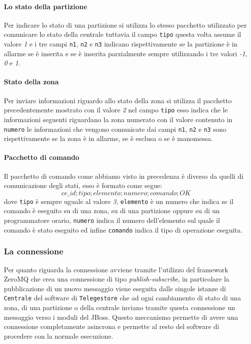 \paragraph{Lo stato della partizione}
Per indicare lo stato di una partizione si utilizza lo stesso pacchetto utilizzato per comunicare lo stato della centrale tuttavia il campo \texttt{tipo} questa volta assume il valore \emph{1} e i tre campi \texttt{n1}, \texttt{n2} e \texttt{n3} indicano rispettivamente se la partizione è in allarme se è inserita e se è inserita parzialmente sempre utilizzando i tre valori \emph{-1, 0} e \emph{1}.
\paragraph{Stato della zona}
Per inviare informazioni riguardo allo stato della zona si utilizza il pacchetto precedentemente mostrato con il valore \emph{2} nel campo \texttt{tipo} esso indica che le informazioni seguenti riguardano la zona numerato con il valore contenuto in \texttt{numero} le informazioni che vengono comunicate dai campi \texttt{n1}, \texttt{n2} e \texttt{n3} sono rispettivamente se la zona è in allarme, se è esclusa o se è manomessa.
\paragraph{Pacchetto di comando}
Il pacchetto di comando come abbiamo visto in precedenza è diverso da quelli di comunicazione degli stati, esso è formato come segue:
$$ce\_id;tipo;elemento;numero;comando;OK$$
dove \texttt{tipo} è sempre uguale al valore \emph{3}, \texttt{elemento} è un numero che indica se il comando è eseguito su di una zona, su di una partizione oppure su di un programmatore orario, \texttt{numero} indica il numero dell'elemento sul quale il comando è stato eseguito ed infine \texttt{comando} indica il tipo di operazione eseguita.
\subsubsection{La connessione}
Per quanto riguarda la connessione avviene tramite l'utilizzo del framework ZeroMQ\cite{zmq} che crea una connessione di tipo \emph{publish-subscribe}, in particolare la pubblicazione di un nuovo messaggio viene eseguita dalle singole istanze di \texttt{Centrale} del software di \texttt{Telegestore} che ad ogni cambiamento di stato di una zona, di una partizione o della centrale inviano tramite questa connessione un messaggio verso i moduli del JBoss.
Questo meccanismo permette di avere una connessione completamente asincrona e permette al resto del software di  procedere con la normale esecuzione.

